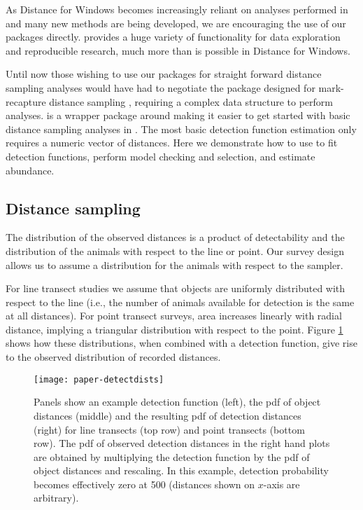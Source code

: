 \documentclass[article]{jss}
\begin{document}
As Distance for Windows becomes increasingly reliant on analyses performed in  and many new methods are being developed, we are encouraging the use of our  packages directly.  provides a huge variety of functionality for data exploration and reproducible research, much more than is possible in Distance for Windows.

Until now those wishing to use our  packages for straight forward distance sampling analyses would have had to negotiate the package  \citep{mrds-pkg} designed for mark-recapture distance sampling \citep{Burt:2014gu}, requiring a complex data structure to perform analyses.  is a wrapper package around  making it easier to get started with basic distance sampling analyses in . The most basic detection function estimation only requires a numeric vector of distances. Here we demonstrate how to use  to fit detection functions, perform model checking and selection, and estimate abundance.


\subsection{Distance sampling}

The distribution of the observed distances is a product of detectability \citep[sometimes referred to as ``perception bias'';][]{Marsh:1989ho} and the distribution of the animals with respect to the line or point. Our survey design allows us to assume a distribution for the animals with respect to the sampler.

For line transect studies we assume that objects are uniformly distributed with respect to the line (i.e., the number of animals available for detection is the same at all distances). For point transect surveys, area increases linearly with radial distance, implying a triangular distribution with respect to the point. Figure \ref{fig:detectiondist} shows how these distributions, when combined with a detection function, give rise to the observed distribution of recorded distances.

\begin{figure}
\begin{center}
\texttt{[image: paper-detectdists]}
\caption{Panels show an example detection function (left), the pdf of object distances (middle) and the resulting pdf of detection distances (right) for line transects (top row) and point transects (bottom row). The pdf of observed detection distances in the right hand plots are obtained by multiplying the detection function by the pdf of object distances and rescaling. In this example, detection probability becomes effectively zero at 500 (distances shown on $x$-axis are arbitrary).}
\label{fig:detectiondist}
\end{center}
\end{figure}
\end{document}
